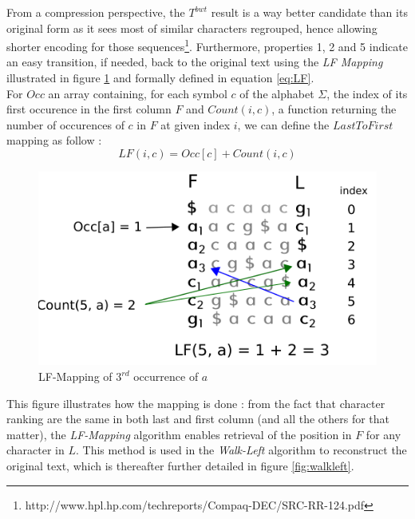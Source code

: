 From a compression perspective, the $T^{bwt}$ result is a way better candidate than its original form as it sees most of similar characters regrouped, hence allowing shorter encoding for those sequences\footnote{http://www.hpl.hp.com/techreports/Compaq-DEC/SRC-RR-124.pdf}. Furthermore, properties 1, 2 and 5 indicate an easy transition, if needed, back to the original text  using the  \textsl{LF Mapping} illustrated in figure \ref{fig:LF} and formally defined in equation \ref{eq:LF}. \\

For $Occ$ an array containing, for each symbol $c$ of the alphabet $\Sigma$, the index of its first occurence in the first column $F$ and $Count(i, c)$, a function returning the number of occurences of $c$ in $F$ at given index $i$, we can define the $LastToFirst$ mapping as follow :
\begin{equation}
    LF(i, c) = Occ[c] + Count(i, c)
    \label{eq:LF}
\end{equation}


\begin{minipage}[t]{0.5\textwidth}
    \begin{figure}[H]
\hspace{-15mm}  \includegraphics[scale = 0.45]{Figures/LF.png}
  \caption{LF-Mapping of $3^{rd}$ occurrence of $a$ }
    \label{fig:LF}
\end{figure}
\end{minipage}
\begin{minipage}[t]{0.45\textwidth}
        This figure illustrates how the mapping is done : from the fact that character ranking are the same in both last and first column (and all the others for that matter), the \textsl{LF-Mapping} algorithm enables retrieval of the position in $F$ for any character in $L$. This method is used in the \textsl{Walk-Left} algorithm to reconstruct the original text, which is thereafter further detailed in figure \ref{fig:walkleft}.
\end{minipage}
\vspace*{5mm}

